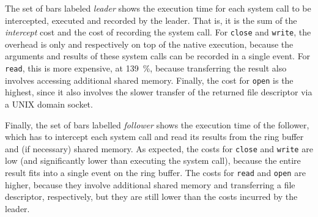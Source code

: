 The set of bars labeled \textit{leader} shows the execution time for
each system call to be intercepted, executed and recorded by the
leader.  That is, it is the sum of the \textit{intercept} cost and the
cost of recording the system call.  For \lstinline`close` and \lstinline`write`,
the overhead is only \closeLeaderOvh and \writeLeaderOvh respectively
on top of the native execution, because the arguments and results of
these system calls can be recorded in a single event.  For \lstinline`read`,
this is more expensive, at \SI{139}{\percent}, because transferring the result also
involves accessing additional shared memory.  Finally, the cost for
\lstinline`open` is the highest, since it also involves the slower transfer
of the returned file descriptor via a UNIX domain socket.

Finally, the set of bars labelled \textit{follower} shows the execution
time of the follower, which has to intercept each system call and read
its results from the ring buffer and (if necessary) shared memory.  As
expected, the costs for \lstinline`close` and \lstinline`write` are low (and
significantly lower than executing the system call), because the
entire result fits into a single event on the ring buffer. The costs
for \lstinline`read` and \lstinline`open` are higher, because they involve
additional shared memory and transferring a file descriptor,
respectively, but they are still lower than the costs incurred by the
leader.




